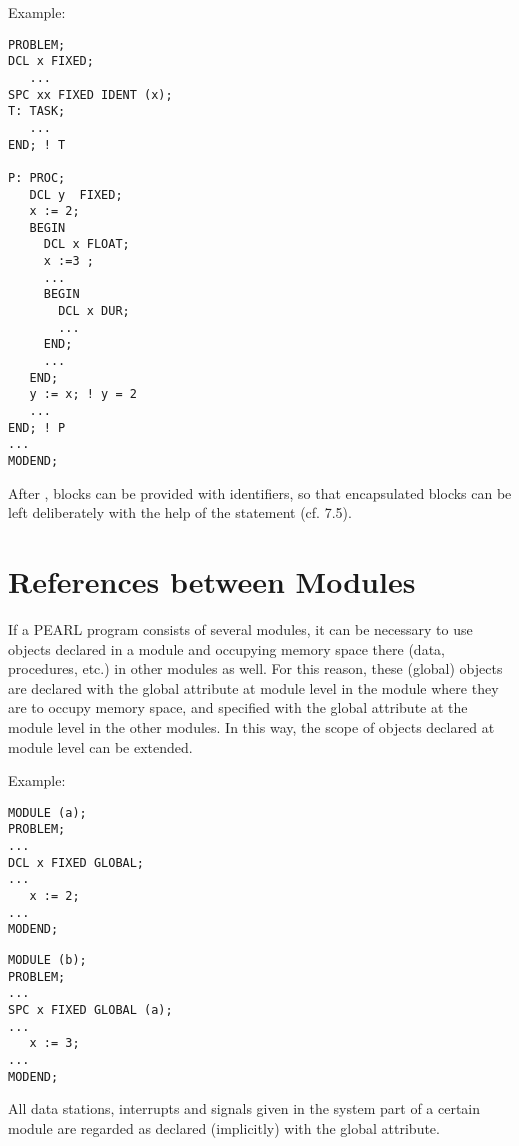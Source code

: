 Example:

\begin{lstlisting}
PROBLEM;
DCL x FIXED;
   ...
SPC xx FIXED IDENT (x);
T: TASK;
   ...
END; ! T

P: PROC;
   DCL y  FIXED;
   x := 2;
   BEGIN
     DCL x FLOAT;
     x :=3 ;
     ...
     BEGIN
       DCL x DUR;
       ...
     END;
     ...
   END;
   y := x; ! y = 2
   ...
END; ! P
...
MODEND;
\end{lstlisting}

After , blocks can be provided with identifiers, so that encapsulated
blocks can be left deliberately with the help of the  statement
(cf. 7.5).

\section{References between Modules}  %
\label{sec_references_module}

If a PEARL program consists of several modules, it can be necessary to
use objects declared in a module and occupying memory space there (data,
procedures, etc.) in other modules as well. For this reason, these
(global) objects are declared with the global attribute at module level
in the module where they are to occupy memory space, and specified with
the global attribute at the module level in the other modules. In this
way, the scope of objects declared at module level can be extended.

Example:
\begin{multicols}{2}
\begin{lstlisting}
MODULE (a);
PROBLEM;  
...      
DCL x FIXED GLOBAL;
...              
   x := 2;      
...           
MODEND;     
\end{lstlisting}
\columnbreak
\begin{lstlisting}
MODULE (b); 
PROBLEM;
...
SPC x FIXED GLOBAL (a);
...                   
   x := 3;
... 
MODEND;
\end{lstlisting}
\end{multicols}

All data stations, interrupts and signals given in the system part of a
certain module are regarded as declared (implicitly) with the global
attribute.

